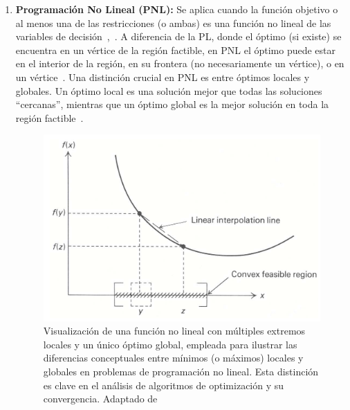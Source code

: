 \begin{enumerate}[label=\arabic*.]
    \item \textbf{Programación No Lineal (PNL):}
    Se aplica cuando la función objetivo o al menos una de las restricciones (o ambas) es una función no lineal de las variables de decisión~\cite[p.~9]{sinha2006},~\cite[p.~410]{nocedal2006}. A diferencia de la PL, donde el óptimo (si existe) se encuentra en un vértice de la región factible, en PNL el óptimo puede estar en el interior de la región, en su frontera (no necesariamente un vértice), o en un vértice~\cite[p.~413, Figura 13.1]{nocedal2006}. Una distinción crucial en PNL es entre óptimos locales y globales. Un óptimo local es una solución mejor que todas las soluciones ``cercanas'', mientras que un óptimo global es la mejor solución en toda la región factible~\cite[p.~413]{nocedal2006}. \\

    \begin{figure}
        \centering
        \includegraphics[width=0.75\linewidth]{img/marcoTeorico/mathprogramming_fig2.png}
        \caption{Visualización de una función no lineal con múltiples extremos locales y un único óptimo global, empleada para ilustrar las diferencias conceptuales entre mínimos (o máximos) locales y globales en problemas de programación no lineal. Esta distinción es clave en el análisis de algoritmos de optimización y su convergencia. Adaptado de~\cite[p.~419]{bradley1977applied}}%
        \label{fig:mathprogramming02}
    \end{figure}


\end{enumerate}
